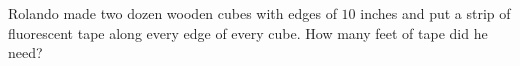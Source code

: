 Rolando made two dozen wooden cubes with edges of $10$ inches and put a strip of fluorescent tape along every edge of every cube. How many feet of tape did he need?
